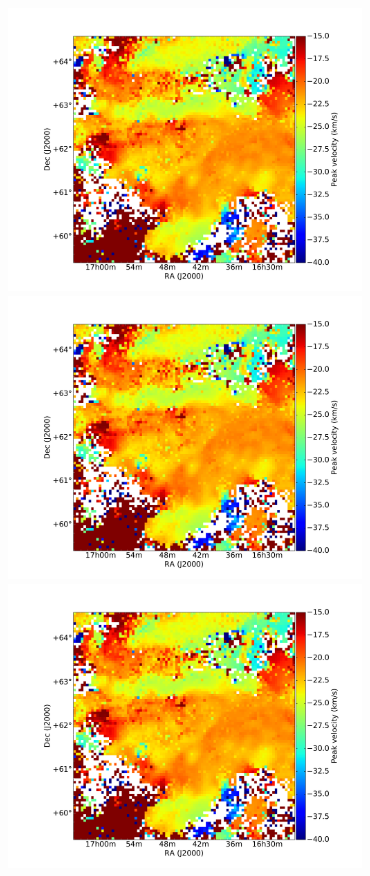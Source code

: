 \documentclass[traditabstract]{aa}
\begin{document}
   \centering
   \includegraphics[page=1,height=7.5cm,trim=110 35 105 75,clip=true]{Figures/Phases_GHIGLS/GHIGLS_velo.pdf}
   \hspace{5mm}
   \includegraphics[page=4,height=7.5cm,trim=110 35 105 75,clip=true]{Figures/Phases_GHIGLS/GHIGLS_velo.pdf} \\
   \vspace{5mm}
   \includegraphics[page=2,height=7.5cm,trim=110 35 105 75,clip=true]{Figures/Phases_GHIGLS/GHIGLS_velo.pdf}
\end{document}
